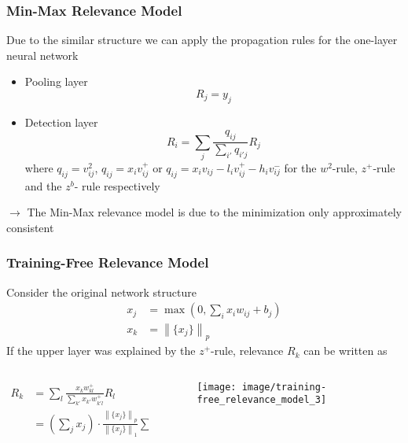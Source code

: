 \documentclass{beamer}
\newcommand\norm[1]{\left\lVert#1\right\rVert}
\begin{document}
\begin{frame}
\frametitle{Min-Max Relevance Model}
Due to the similar structure we can apply the propagation rules for the one-layer neural network
\begin{itemize}
\item Pooling layer
\begin{equation*}
R_j = y_j
\end{equation*}

\item Detection layer
\begin{equation*}
R_i = \sum_j \frac{q_{ij}}{\sum_{i'} q_{i'j}} R_j
\end{equation*}
where $q_{ij}= v_{ij}^2$, $q_{ij}= x_i v_{ij}^+$ or $q_{ij}= x_i v_{ij} - l_i v_{ij}^+ - h_i v_{ij}^-$ for the $w^2$-rule, $z^+$-rule and the $z^b$- rule respectively
\end{itemize}
\vspace{0.5cm}

$\rightarrow$ The Min-Max relevance model is due to the minimization only approximately consistent
\end{frame}



\begin{frame}
\frametitle{Training-Free Relevance Model}
Consider the original network structure
\begin{align*}
x_j &= \max(0,\sum_ix_i w_{ij} + b_j)\\
x_k &= \norm{\{x_j\}}_p
\end{align*}
If the upper layer was explained by the $z^+$-rule, relevance $R_k$ can be written as


 \begin{columns}
          \begin{column}{5cm}
			\begin{align*}
			R_k &= \sum_l \frac{x_k w_{kl}^+}{\sum_{k'} x_{k'} w_{k'l}^+} R_l\\
				&= (\sum_j x_j) \cdot \frac{\norm{\{x_j\}}_p}{\norm{\{x_j\}}_1}   \sum_l \frac{w_{kl}^+R_l}{\sum_{k'} x_{k'} w_{k'l}^+} 
			\end{align*}
            \end{column} 
            \begin{column}{5cm}
			\begin{figure}
			\label{fig1}
			\texttt{[image: image/training-free\_relevance\_model\_3]}
			\end{figure}
	\end{column}
\end{columns} 

\end{frame}
\end{document}
